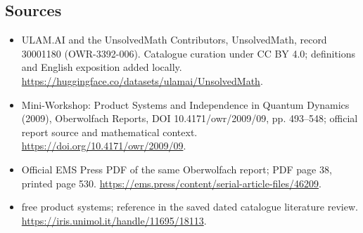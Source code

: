 \documentclass[11pt]{article}
\begin{document}
\subsection{Sources}
\begin{itemize}
\item[\hypertarget{source:30001180:1}{S1}] ULAM.AI and the UnsolvedMath Contributors, UnsolvedMath, record 30001180 (OWR-3392-006). Catalogue curation under CC BY 4.0; definitions and English exposition added locally.
\url{https://huggingface.co/datasets/ulamai/UnsolvedMath}.
\item[\hypertarget{source:30001180:2}{S2}] Mini-Workshop: Product Systems and Independence in Quantum Dynamics (2009), Oberwolfach Reports, DOI 10.4171/owr/2009/09, pp. 493--548; official report source and mathematical context.
\url{https://doi.org/10.4171/owr/2009/09}.
\item[\hypertarget{source:30001180:3}{S3}] Official EMS Press PDF of the same Oberwolfach report; PDF page 38, printed page 530.
\url{https://ems.press/content/serial-article-files/46209}.
\item[\hypertarget{source:30001180:4}{S4}] free product systems; reference in the saved dated catalogue literature review.
\url{https://iris.unimol.it/handle/11695/18113}.
\end{itemize}
\label{end:30001180}
\end{document}

